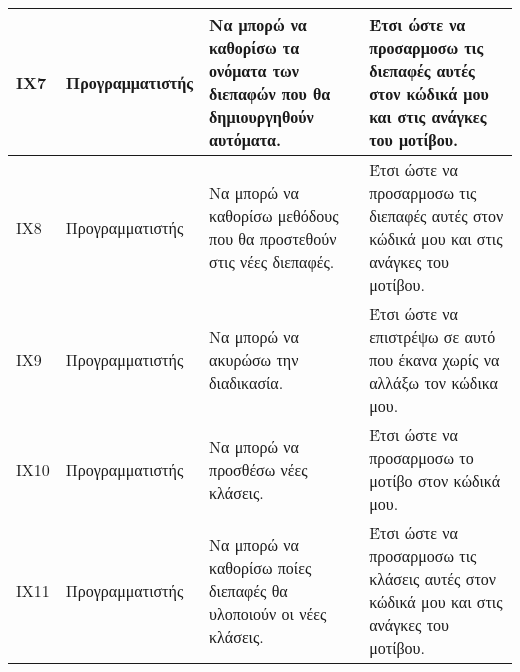 \begin{table}[H]
\begin{tabular}{|p{1.5cm}|p{3.5cm}|p{4.5cm}|p{4.7cm}|}
        ΙΧ7 & Προγραμματιστής & Να μπορώ να καθορίσω τα ονόματα των διεπαφών που θα δημιουργηθούν αυτόματα. & Έτσι ώστε να προσαρμοσω τις διεπαφές αυτές στον κώδικά μου και στις ανάγκες του μοτίβου. \\ \hline
        ΙΧ8 & Προγραμματιστής & Να μπορώ να καθορίσω μεθόδους που θα προστεθούν στις νέες διεπαφές. & Έτσι ώστε να προσαρμοσω τις διεπαφές αυτές στον κώδικά μου και στις ανάγκες του μοτίβου. \\ \hline
        ΙΧ9 & Προγραμματιστής & Να μπορώ να ακυρώσω την διαδικασία. & Έτσι ώστε να επιστρέψω σε αυτό που έκανα χωρίς να αλλάξω τον κώδικα μου. \\ \hline
		ΙΧ10 & Προγραμματιστής & Να μπορώ να προσθέσω νέες κλάσεις. & Έτσι ώστε να προσαρμοσω το μοτίβο στον κώδικά μου. \\ \hline
		ΙΧ11 & Προγραμματιστής & Να μπορώ να καθορίσω ποίες διεπαφές θα υλοποιούν οι νέες κλάσεις. & Έτσι ώστε να προσαρμοσω τις κλάσεις αυτές στον κώδικά μου και στις ανάγκες του μοτίβου. \\ \hline
    \end{tabular}
\end{table}
